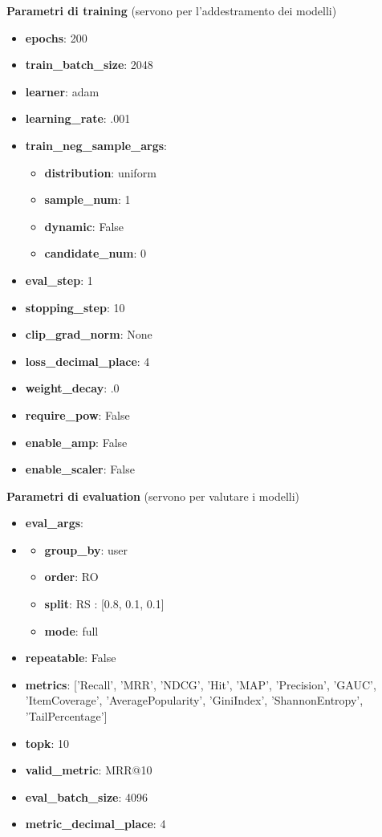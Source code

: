 \noindent \textbf{Parametri di training} (servono per l'addestramento dei modelli)
\begin{itemize}
    \item \textbf{epochs}: 200
    \item \textbf{train\_batch\_size}: 2048
    \item \textbf{learner}: adam
    \item \textbf{learning\_rate}: .001
    \item \textbf{train\_neg\_sample\_args}: 
    \begin{itemize}
        \item \textbf{distribution}: uniform
        \item \textbf{sample\_num}: 1
        \item \textbf{dynamic}: False
        \item \textbf{candidate\_num}: 0
    \end{itemize}
    \item \textbf{eval\_step}: 1
    \item \textbf{stopping\_step}: 10
    \item \textbf{clip\_grad\_norm}: None
    \item \textbf{loss\_decimal\_place}: 4
    \item \textbf{weight\_decay}: .0
    \item \textbf{require\_pow}: False
    \item \textbf{enable\_amp}: False
    \item \textbf{enable\_scaler}: False
\end{itemize}


\noindent \textbf{Parametri di evaluation} (servono per valutare i modelli)


\begin{itemize}
    \item \textbf{eval\_args}:
    \item \begin{itemize}
                \item \textbf{group\_by}: user
                \item \textbf{order}: RO
                \item \textbf{split}: RS : [0.8, 0.1, 0.1]
                \item \textbf{mode}: full
            \end{itemize}
    \item \textbf{repeatable}: False
    \item \textbf{metrics}: ['Recall', 'MRR', 'NDCG', 'Hit', 'MAP', 'Precision', 'GAUC', 'ItemCoverage', 'AveragePopularity', 'GiniIndex', 'ShannonEntropy', 'TailPercentage']
    \item \textbf{topk}: 10
    \item \textbf{valid\_metric}: MRR@10
    \item \textbf{eval\_batch\_size}: 4096
    \item \textbf{metric\_decimal\_place}: 4
\end{itemize}



